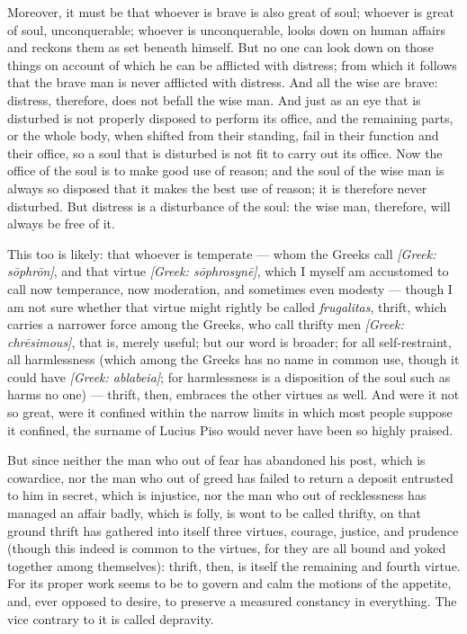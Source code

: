  Moreover, it must be that whoever is brave is also great of soul; whoever is great of soul, unconquerable; whoever is unconquerable, looks down on human affairs and reckons them as set beneath himself. But no one can look down on those things on account of which he can be afflicted with distress; from which it follows that the brave man is never afflicted with distress. And all the wise are brave: distress, therefore, does not befall the wise man. And just as an eye that is disturbed is not properly disposed to perform its office, and the remaining parts, or the whole body, when shifted from their standing, fail in their function and their office, so a soul that is disturbed is not fit to carry out its office. Now the office of the soul is to make good use of reason; and the soul of the wise man is always so disposed that it makes the best use of reason; it is therefore never disturbed. But distress is a disturbance of the soul: the wise man, therefore, will always be free of it.

 This too is likely: that whoever is temperate — whom the Greeks call \textit{[Greek: sōphrōn]}, and that virtue \textit{[Greek: sōphrosynē]}, which I myself am accustomed to call now temperance, now moderation, and sometimes even modesty — though I am not sure whether that virtue might rightly be called \textit{frugalitas}, thrift, which carries a narrower force among the Greeks, who call thrifty men \textit{[Greek: chrēsimous]}, that is, merely useful; but our word is broader; for all self-restraint, all harmlessness (which among the Greeks has no name in common use, though it could have \textit{[Greek: ablabeia]}; for harmlessness is a disposition of the soul such as harms no one) — thrift, then, embraces the other virtues as well. And were it not so great, were it confined within the narrow limits in which most people suppose it confined, the surname of Lucius Piso would never have been so highly praised.

 But since neither the man who out of fear has abandoned his post, which is cowardice, nor the man who out of greed has failed to return a deposit entrusted to him in secret, which is injustice, nor the man who out of recklessness has managed an affair badly, which is folly, is wont to be called thrifty, on that ground thrift has gathered into itself three virtues, courage, justice, and prudence (though this indeed is common to the virtues, for they are all bound and yoked together among themselves): thrift, then, is itself the remaining and fourth virtue. For its proper work seems to be to govern and calm the motions of the appetite, and, ever opposed to desire, to preserve a measured constancy in everything. The vice contrary to it is called depravity.

